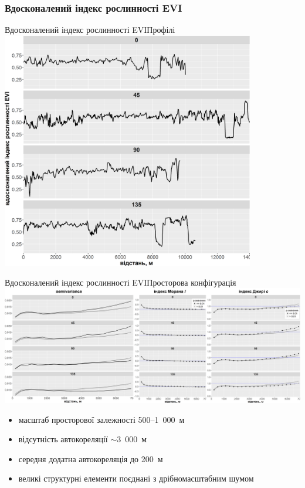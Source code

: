\documentclass[]{beamer}
\begin{document}
\subsubsection{Вдосконалений індекс рослинності EVI}
\begin{frame}{Вдосконалений індекс рослинності EVI}{Профілі}
\includegraphics[width=0.83\textwidth]{./pres_figures/plots_evi/profiles_plot.png}%
\end{frame}

\begin{frame}{Вдосконалений індекс рослинності EVI}{Просторова конфігурація}
\includegraphics[width=\textwidth]{./pres_figures/plots_evi/evi_all.png}%

\begin{itemize}
\item масштаб просторової залежності 500--1~000~м
\item відсутність автокореляції $\sim$3~000~м
\item середня додатна автокореляція до 200~м
\item великі структурні елементи поєднані з дрібномасштабним шумом
\end{itemize}
\end{frame}
\end{document}

